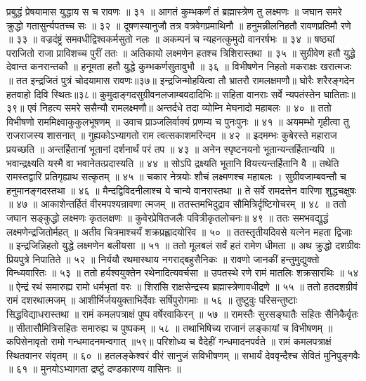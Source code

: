 प्रबुद्धं प्रेषयामास युद्धाय स च रावणः ॥ ३१ ॥
आगतं कुम्भकर्णं तं ब्रह्मास्त्रेण तु लक्ष्मणः ॥
जघान समरे क्रुद्धो गतासुर्न्यपतच्च सः ॥ ३२ ॥
दूषणस्यानुजौ तत्र वत्रवेगप्रमाथिनौ ॥
हनुमन्नीलनिहतौ रावणप्रतिमौ रणे ॥ ३३ ॥
वज्रदंष्ट्रं समवधीद्विश्वकर्मसुतो नलः ॥
अकम्पनं च न्यहनत्कुमुदो वानरर्षभः ॥ ३४ ॥
षष्ठ्यां पराजितो राजा प्राविशच्च पुरीं ततः ॥
अतिकायो लक्ष्मणेन हतश्च त्रिशिरास्तथा ॥ ३५ ॥
सुग्रीवेण हतौ युद्धे देवान्त कनरान्तकौ ॥
हनूमता हतौ युद्धे कुम्भकर्णसुतावुभौ ॥ ३६ ॥
विभीषणेन निहतो मकराक्षः खरात्मजः ॥
तत इन्द्रजितं पुत्रं चोदयामास रावणः॥३७॥
इन्द्रजिन्मोहयित्वा तौ भ्रातरौ रामलक्षमणौ॥
घोरैः शरैरङ्गदेन हतवाहो दिवि स्थितः॥३८॥
कुमुदाङ्गदसुग्रीवनलजाम्बवदादिभिः॥
सहिता वानराः सर्वे न्यपतंस्तेन घातिताः॥३९॥
एवं निहत्य समरे ससैन्यौ रामलक्ष्मणौ॥
अन्तर्दधे तदा व्योम्नि मेघनादो महाबलः ॥ ४० ॥
ततो विभीषणो राममिक्ष्वाकुकुलभूषणम् ॥
उवाच प्राञ्जलिर्वाक्यं प्रणम्य च पुनःपुनः ॥ ४१ ॥
अयमम्भो गृहीत्वा तु राजराजस्य शासनात् ॥
गुह्यकोऽभ्यागतो राम त्वत्सकाशमरिन्दम ॥ ४२ ॥
इदमम्भः कुबेरस्ते महाराज प्रयच्छति ॥
अन्तर्हितानां भूतानां दर्शनार्थं परं तप ॥ ४३ ॥
अनेन स्पृष्टनयनो भूतान्यन्तर्हितान्यपि ॥
भवान्द्रक्ष्यति यस्मै वा भवानेतत्प्रदास्यति ॥ ४४ ॥
सोऽपि द्रक्ष्यति भूतानि वियत्त्यन्तर्हितानि वै ॥
तथेति रामस्तद्वारि प्रतिगृह्याथ सत्कृतम् ॥ ४५ ॥
चकार नेत्रयोः शौचं लक्ष्मणश्च महाबलः ।
सुग्रीवजाम्बवन्तौ च हनुमानङ्गदस्तथा ॥ ४६ ॥
मैन्दद्विविदनीलाश्च ये चान्ये वानरास्तथा ॥
ते सर्वे रामदत्तेन वारिणा शुद्धचक्षुषः ॥ ४७ ॥
आकाशेन्तर्हितं वीरमपश्यन्रावणा त्मजम् ॥
ततस्तमभिदुद्राव सौमित्रिर्दृष्टिगोचरम् ॥ ४८ ॥
ततो जघान सङ्कुद्धो लक्ष्मणः कृतलक्षणः ॥
कुवेरप्रेषितजलैः पवित्रीकृतलोचनः॥ ४९ ॥
ततः समभवद्युद्धं लक्ष्मणेन्द्रजितोर्महत् ॥
अतीव चित्रमाश्चर्यं शक्रप्रह्लादयोरिव ॥ ५० ॥
ततस्तृतीयदिवसे यत्नेन महता द्विजाः ॥
इन्द्रजिन्निहतो युद्धे लक्ष्मणेन बलीयसा ॥ ५१ ॥
ततो मूलबलं सर्वं हतं रामेण धीमता ॥
अथ क्रुद्धो दशग्रीवः प्रियपुत्रे निपातिते ॥ ५२ ॥
निर्ययौ रथमास्थाय नगराद्बहुसैनिकः ॥
रावणो जानकीं हन्तुमुद्युक्तो विन्ध्यवारितः ॥ ५३ ॥
ततो हर्यश्वयुक्तेन रथेनादित्यवर्चसा ॥
उपतस्थे रणे रामं मातलिः शक्रसारथिः ॥ ५४ ॥
ऐन्द्रं रथं समारुह्य रामो धर्मभृतां वरः ॥
शिरांसि राक्षसेन्द्रस्य ब्रह्मास्त्रेणावधीद्रणे ॥ ५५ ॥
ततो हतदशग्रीवं रामं दशरथात्मजम् ॥
आशीर्भिर्जययुक्ताभिर्देवाः सर्षिपुरोगमाः ॥ ५६ ॥
तुष्टुवुः परिसन्तुष्टाः सिद्धविद्याधरास्तथा ॥
रामं कमलपत्राक्षं पुष्प वर्षेरवाकिरन् ॥ ५७ ॥
रामस्तैः सुरसङ्घातैः सहितः सैनिकैर्वृतः ॥
सीतासौमित्रिसहितः समारुह्य च पुष्पकम् ॥ ५८ ॥
तथाभिषिच्य राजानं लङ्कायां च विभीषणम् ॥
कपिसेनावृतो रामो गन्धमादनमन्वगात् ॥५९॥
परिशोध्य च वैदेहीं गन्धमादनपर्वते ॥
रामं कमलपत्राक्षं स्थितवानर संवृतम् ॥ ६० ॥
हतलङ्केश्वरं वीरं सानुजं सविभीषणम् ॥
सभार्यं देववृन्दैश्च सेवितं मुनिपुङ्गवैः ॥ ६१ ॥
मुनयोऽभ्यागता द्रष्टुं दण्डकारण्य वासिनः ॥
